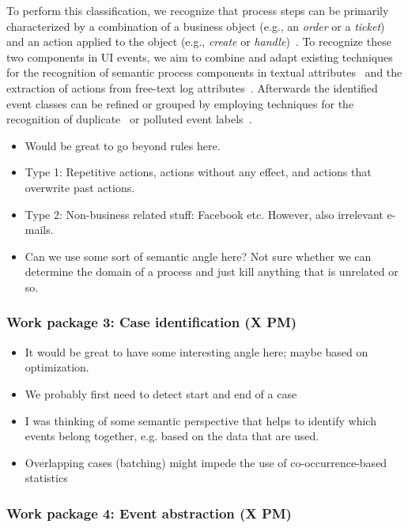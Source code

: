 To perform this classification, we recognize that process steps  can be primarily characterized by a combination of a business object (e.g., an \emph{order} or a \emph{ticket}) and an action applied to the object (e.g., \emph{create} or \emph{handle})~\cite{ref}. 
To recognize these two components in UI events, we aim to combine and adapt existing techniques for the recognition of semantic process components in textual attributes~\cite{rebmann} and the extraction of actions from free-text log attributes~\cite{gupta2020analyzing}. Afterwards the identified event classes can be refined or grouped by employing techniques for the recognition of duplicate~\cite{ref} or polluted event labels~\cite{ref}.

 
 

\begin{itemize}
\item Would be great to go beyond rules here. 
\item Type 1: Repetitive actions, actions without any effect, and actions that overwrite past actions. 
\item Type 2: Non-business related stuff: Facebook etc. However, also irrelevant e-mails.
\item Can we use some sort of semantic angle here? Not sure whether we can determine the domain of a process and just kill anything that is unrelated or so. 
\end{itemize}


\subsubsection{Work package 3: Case identification (X PM)}
\label{sec:wp3}

\begin{itemize}
\item It would be great to have some interesting angle here; maybe based on optimization. 
\item We probably first need to detect start and end of a case 
\item I was thinking of some semantic perspective that helps to identify which events belong together, e.g. based on the data that are used. 
\item Overlapping cases (batching) might impede the use of co-occurrence-based statistics
\end{itemize}

\subsubsection{Work package 4: Event abstraction (X PM)}
\label{sec:wp4}

